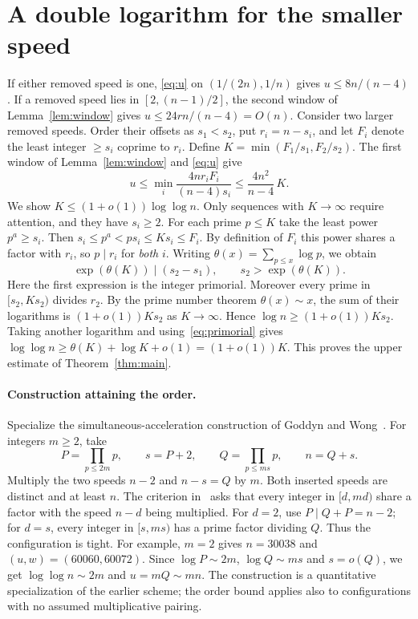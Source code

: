 \documentclass[11pt,a4paper]{article}
\begin{document}
\newpage
\section{A double logarithm for the smaller speed}
If either removed speed is one, \eqref{eq:u} on $(1/(2n),1/n)$ gives
$u\le8n/(n-4)$. If a removed speed lies in $[2,(n-1)/2]$, the second
window of Lemma~\ref{lem:window} gives $u\le24rn/(n-4)=O(n)$. Consider
two larger removed speeds. Order their offsets as $s_1<s_2$, put
$r_i=n-s_i$, and let $F_i$ denote the least integer $\ge s_i$ coprime
to $r_i$. Define $K=\min(F_1/s_1,F_2/s_2)$. The first window of
Lemma~\ref{lem:window} and \eqref{eq:u} give
\[
 u\le \min_i\frac{4nr_i F_i}{(n-4)s_i}
 \le \frac{4n^2}{n-4}\,K .
\]
We show $K\le(1+o(1))\log\log n$. Only sequences with $K\to\infty$
require attention, and they have $s_i\ge2$. For each prime $p\le K$ take
the least power $p^a\ge s_i$. Then
$s_i\le p^a<p s_i\le K s_i\le F_i$. By definition of $F_i$ this power
shares a factor with $r_i$, so $p\mid r_i$ for \emph{both} $i$.
Writing $\theta(x)=\sum_{p\le x}\log p$, we obtain
\begin{equation}\label{eq:primorial}
 \exp(\theta(K))\mid (s_2-s_1),\qquad s_2>\exp(\theta(K)).
\end{equation}
Here the first expression is the integer primorial. Moreover every prime
in $[s_2,Ks_2)$ divides $r_2$. By the prime number theorem
$\theta(x)\sim x$, the sum of their logarithms is $(1+o(1))K s_2$ as
$K\to\infty$. Hence $\log n\ge(1+o(1))K s_2$.
Taking another logarithm and using~\eqref{eq:primorial} gives
$\log\log n\ge\theta(K)+\log K+o(1)=(1+o(1))K$. This proves the upper
estimate of Theorem~\ref{thm:main}.

\paragraph{Construction attaining the order.}
Specialize the simultaneous-acceleration construction of Goddyn and
Wong~\cite[Theorem 3.1 and Corollary 3.3]{GW}. For integers $m\ge2$, take
\[
 P=\prod_{p\le2m}p,\qquad s=P+2,\qquad
 Q=\prod_{p\le ms}p,\qquad n=Q+s.
\]
Multiply the two speeds $n-2$ and $n-s=Q$ by $m$. Both inserted
speeds are distinct and at least $n$. The criterion in~\cite{GW} asks
that every integer in $[d,md)$ share a factor with the speed $n-d$ being
multiplied. For $d=2$, use $P\mid Q+P=n-2$; for $d=s$, every integer in
$[s,ms)$ has a prime factor dividing $Q$. Thus the configuration is tight.
For example, $m=2$ gives $n=30038$ and $(u,w)=(60060,60072)$.
Since $\log P\sim2m$, $\log Q\sim ms$ and $s=o(Q)$, we get
$\log\log n\sim 2m$ and $u=mQ\sim mn$. The construction is a quantitative
specialization of the earlier scheme; the order bound applies also to
configurations with no assumed multiplicative pairing.
\end{document}
